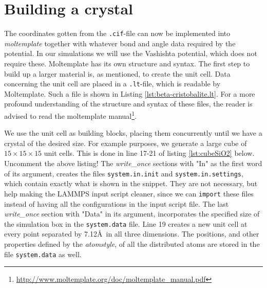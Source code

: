 \documentclass[twoside,english]{uiofysmaster}
\begin{document}
\section{Building a crystal}
The coordinates gotten from the \texttt{.cif}-file can now be implemented into \textit{moltemplate} together with whatever bond and angle data required by the potential. In our simulations we will use the Vashishta potential, which does not require these. 
Moltemplate has its own structure and syntax. 
The first step to build up a larger material is, as mentioned, to create the unit cell. 
Data concerning the unit cell are placed in a \texttt{.lt}-file, which is readable by Moltemplate. 
Such a file is shown in Listing \ref{lst:beta-cristobalite.lt}. 
For a more profound understanding of the structure and syntax of these files, the reader is advised to read the moltemplate manual\footnote{\url{http://www.moltemplate.org/doc/moltemplate_manual.pdf}}.





We use the unit cell as building blocks, placing them concurrently until we have a crystal of the desired size. For example purposes, we generate a large cube of $15\times15\times15$ unit cells. This is done in line 17-21 of listing \ref{lst:cubeSiO2} below.
%
{\Huge Uncomment the above listing!}
The \textit{write\_once} sections with "In" as the first word of its argument, creates the files \texttt{system.in.init} and \texttt{system.in.settings}, which contain exactly what is shown in the snippet. 
They are not necessary, but help making the LAMMPS input script cleaner, since we can \texttt{import} these files instead of having all the configurations in the input script file.
The last \textit{write\_once} section with "Data" in its argument, incorporates the specified size of the simulation box in the \texttt{system.data} file. 
Line 19 creates a new unit cell at every point separated by 7.12\AA ~in all three dimensions. The positions, and other properties defined by the \textit{atomstyle}, of all the distributed atoms are stored in the file \texttt{system.data} as well. 
\end{document}
